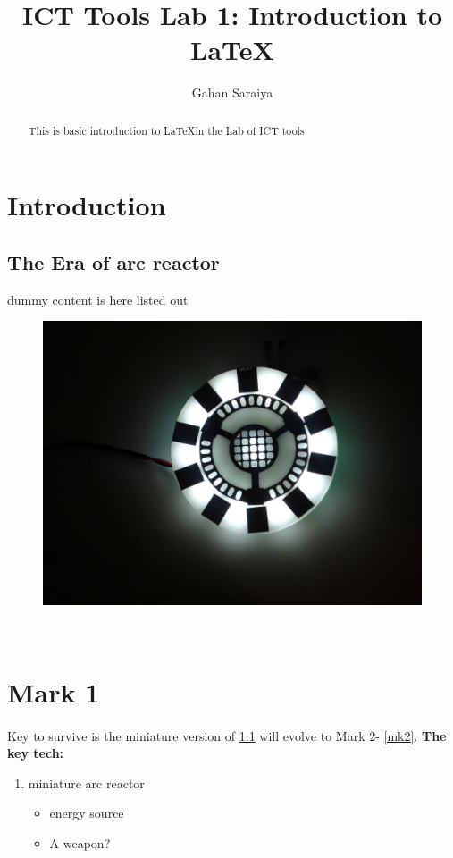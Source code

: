 \documentclass[16pt]{article}
\title{ICT Tools Lab 1: Introduction to \LaTeX}
\author{Gahan Saraiya}
\date{}
\begin{document}
\maketitle
\tableofcontents
\listoffigures

\newpage
\begin{abstract}
	This is basic introduction to \LaTeX in the Lab of ICT tools
\end{abstract}


\section{Introduction}
\label{intro}
\subsection{The Era of arc reactor}
\label{arc_reactor}
\hspace{20pt}
dummy content is here listed out
\begin{figure}[h]
	\includegraphics[scale=0.2]{arc_reactor.jpg}
\end{figure}
\\
\section{Mark 1}
\label{mk1}
\paragraph{}
Key to survive is the miniature version of \ref{arc_reactor} will evolve to Mark 2- \ref{mk2}.
\newline
\textbf{The key tech:}
\begin{enumerate}
	\item miniature arc reactor
	\begin{itemize}
		\item energy source
		\item A weapon?
	\end{itemize}
\end{enumerate}
\end{document}
